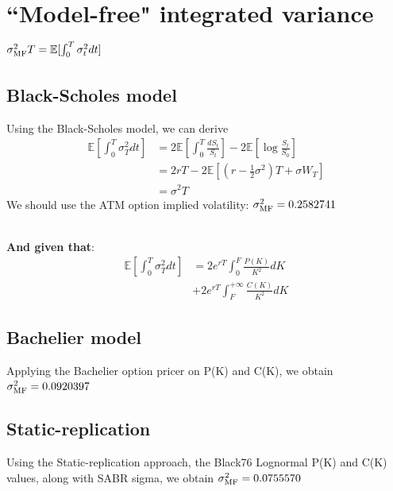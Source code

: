 \documentclass{article}
\begin{document}
\section{``Model-free" integrated   variance  $\sigma^2_{\textnormal{MF}}T=\mathbb{E}[\int_{0}^{T} {\sigma^2_t dt}]$}
\begin{minipage}[t]{0.5\textwidth}
	\begin{tcolorbox}[height=8cm,boxsep=5pt,arc=0pt,auto outer arc,colback=white,colframe=black]
\subsection{Black-Scholes model}
Using the Black-Scholes model, we can derive  
\begin{align*}
\mathbb{E}[\int_{0}^{T}{\sigma^2_T dt}]&=2\mathbb{E}[\int_{0}^{T}\frac{dS_t}{S_t}]-2\mathbb{E}[\log{\frac{S_t}{S_0}}]\\
&=2rT-2\mathbb{E}[(r-\frac{1}{2} \sigma^2 )T + \sigma W_T]\\
&=\sigma^{2}T
\end{align*}
We should use the ATM option implied volatility:  $\sigma^2_{\textnormal{MF}}=0.2582741$ \\ \\
	\end{tcolorbox}
\end{minipage}
\begin{minipage}[t]{0.5\textwidth}
	\begin{tcolorbox}[height=8cm,boxsep=5pt,arc=0pt,auto outer arc,colback=white,colframe=black]
\textbf{And given that}:
\begin{align*}
\mathbb{E}[\int_{0}^{T}{\sigma^2_T dt}]&=2e^{rT}\int_{0}^{F}{\frac{P(K)}{K^2}dK}\\
&+2e^{rT}\int_{F}^{+\infty}{\frac{C(K)}{K^2}dK}
\end{align*}
\subsection{Bachelier model}
Applying the Bachelier option pricer on P(K) and C(K), we obtain $\sigma^2_{\textnormal{MF}}=0.0920397$ 

\subsection{Static-replication}
Using the Static-replication approach, the Black76 Lognormal P(K) and C(K) values, along with SABR sigma, we obtain $\sigma^2_{\textnormal{MF}}=0.0755570$ 
	\end{tcolorbox}
\end{minipage}
\end{document}
